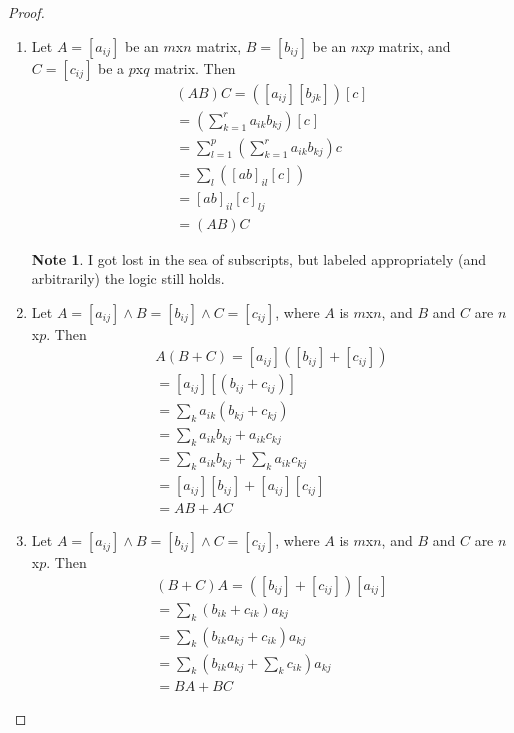 \documentclass[11pt]{article}
\theoremstyle{definition}
\newtheorem{note}{Note}
\begin{document}
		\begin{shaded}
			\begin{proof}
				\begin{enumerate}[label=(\alph*)]
					\item Let $A = [a_{ij}]$ be an $m$x$n$ matrix, $B = [b_{ij}]$ be an $n$x$p$ matrix, and $C=[c_{ij}]$ be a $p$x$q$ matrix. Then
					\begin{align*}
						(AB)C = ([a_{ij}][b_{jk}])[c_{}] \\
						= (\sum\limits_{k=1}^{r} a_{ik}b_{kj})[c_{}] \\
						= \sum\limits_{l=1}^{p}(\sum\limits_{k=1}^{r} a_{ik}b_{kj})c_{} \\
						= \sum\limits_{l}([ab]_{il}[c]_{}) \\
						= [ab]_{il}[c]_{lj} \\
						= (AB)C
					\end{align*}
					
					\begin{note}
						I got lost in the sea of subscripts, but labeled appropriately (and arbitrarily) the logic still holds.
					\end{note}
					
					\item Let $A = [a_{ij}] \land B = [b_{ij}] \land C = [c_{ij}]$, where $A$ is $m$x$n$, and $B$ and $C$ are $n$x$p$. Then
					\begin{align*}
						A(B+C) = [a_{ij}]([b_{ij}] + [c_{ij}]) \\
						= [a_{ij}][(b_{ij} + c_{ij})] \\
						= \sum\limits_{k}a_{ik}(b_{kj}+c_{kj}) \\
						= \sum\limits_{k}a_{ik}b_{kj} + a_{ik}c_{kj} \\
						= \sum\limits_{k}a_{ik}b_{kj} + \sum\limits_{k}a_{ik}c_{kj} \\
						= [a_{ij}][b_{ij}] + [a_{ij}][c_{ij}] \\
						= AB + AC
					\end{align*} 
					
					\item Let $A = [a_{ij}] \land B = [b_{ij}] \land C = [c_{ij}]$, where $A$ is $m$x$n$, and $B$ and $C$ are $n$x$p$. Then
					\begin{align*}
						(B+C)A = ([b_{ij}] + [c_{ij}])[a_{ij}] \\
						= \sum\limits_{k}(b_{ik} + c_{ik})a_{kj} \\
						= \sum\limits_{k}(b_{ik}a_{kj} + c_{ik})a_{kj} \\
						= \sum\limits_{k}(b_{ik}a_{kj} + \sum\limits_{k}c_{ik})a_{kj} \\
						= BA + BC
					\end{align*}
				\end{enumerate}
			\end{proof}
		\end{shaded}
\end{document}

